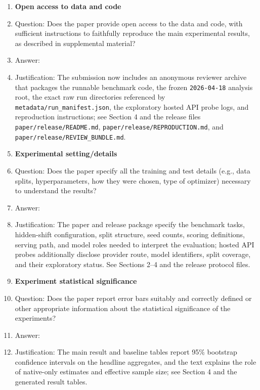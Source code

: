 \begin{enumerate}
\item {\bf Open access to data and code}
    \item[] Question: Does the paper provide open access to the data and code, with sufficient instructions to faithfully reproduce the main experimental results, as described in supplemental material?
    \item[] Answer: \answerYes{}
    \item[] Justification: The submission now includes an anonymous reviewer archive that packages the runnable benchmark code, the frozen \texttt{2026-04-18} analysis root, the exact raw run directories referenced by \texttt{metadata/run\_manifest.json}, the exploratory hosted API probe logs, and reproduction instructions; see Section 4 and the release files \texttt{paper/release/README.md}, \texttt{paper/release/REPRODUCTION.md}, and \texttt{paper/release/REVIEW\_BUNDLE.md}.

\item {\bf Experimental setting/details}
    \item[] Question: Does the paper specify all the training and test details (e.g., data splits, hyperparameters, how they were chosen, type of optimizer) necessary to understand the results?
    \item[] Answer: \answerYes{}
    \item[] Justification: The paper and release package specify the benchmark tasks, hidden-shift configuration, split structure, seed counts, scoring definitions, serving path, and model roles needed to interpret the evaluation; hosted API probes additionally disclose provider route, model identifiers, split coverage, and their exploratory status. See Sections 2--4 and the release protocol files.

\item {\bf Experiment statistical significance}
    \item[] Question: Does the paper report error bars suitably and correctly defined or other appropriate information about the statistical significance of the experiments?
    \item[] Answer: \answerYes{}
    \item[] Justification: The main result and baseline tables report 95\% bootstrap confidence intervals on the headline aggregates, and the text explains the role of native-only estimates and effective sample size; see Section 4 and the generated result tables.


\end{enumerate}
